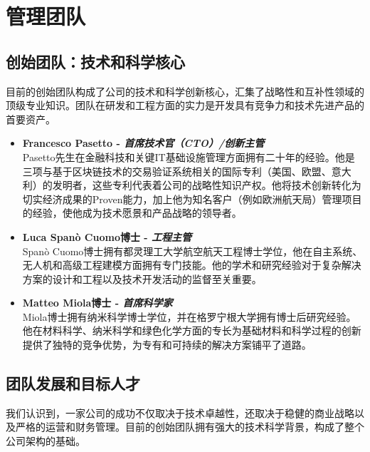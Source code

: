 \documentclass[11pt, a4paper, oneside]{article}
\begin{document}
\newpage
\section{管理团队}

\subsection{创始团队：技术和科学核心}

目前的创始团队构成了公司的技术和科学创新核心，汇集了战略性和互补性领域的顶级专业知识。团队在研发和工程方面的实力是开发具有竞争力和技术先进产品的首要资产。

\begin{itemize}
    \item \textbf{Francesco Pasetto - \textit{首席技术官（CTO）/创新主管}} \\
    Pasetto先生在金融科技和关键IT基础设施管理方面拥有二十年的经验。他是三项与基于区块链技术的交易验证系统相关的国际专利（美国、欧盟、意大利）的发明者，这些专利代表着公司的战略性知识产权。他将技术创新转化为切实经济成果的Proven能力，加上他为知名客户（例如欧洲航天局）管理项目的经验，使他成为技术愿景和产品战略的领导者。

    \item \textbf{Luca Spanò Cuomo博士 - \textit{工程主管}} \\
    Spanò Cuomo博士拥有都灵理工大学航空航天工程博士学位，他在自主系统、无人机和高级工程建模方面拥有专门技能。他的学术和研究经验对于复杂解决方案的设计和工程以及技术开发活动的监督至关重要。

    \item \textbf{Matteo Miola博士 - \textit{首席科学家}} \\
    Miola博士拥有纳米科学博士学位，并在格罗宁根大学拥有博士后研究经验。他在材料科学、纳米科学和绿色化学方面的专长为基础材料和科学过程的创新提供了独特的竞争优势，为专有和可持续的解决方案铺平了道路。
\end{itemize}



\subsection{团队发展和目标人才}

我们认识到，一家公司的成功不仅取决于技术卓越性，还取决于稳健的商业战略以及严格的运营和财务管理。目前的创始团队拥有强大的技术科学背景，构成了整个公司架构的基础。
\end{document}

